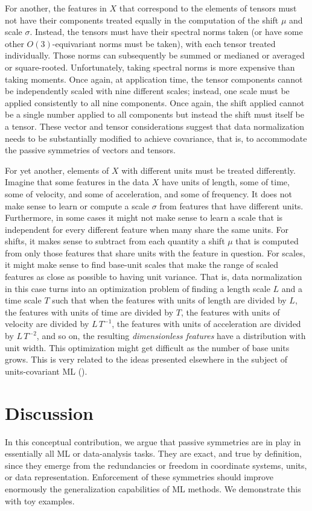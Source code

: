 \documentclass[]{article} %
\begin{document}
For another, the features in $X$ that correspond to the elements of tensors must not have their components treated equally in the computation of the shift $\mu$ and scale $\sigma$.
Instead, the tensors must have their spectral norms taken (or have some other $O(3)$-equivariant norms must be taken), with each tensor treated individually.
Those norms can subsequently be summed or medianed or averaged or square-rooted.
Unfortunately, taking spectral norms is more expensive than taking moments.
Once again, at application time, the tensor components cannot be independently scaled with nine different scales; instead, one scale must be applied consistently to all nine components.
Once again, the shift applied cannot be a single number applied to all components but instead the shift must itself be a tensor.
These vector and tensor considerations suggest that data normalization needs to be substantially modified to achieve covariance, that is, to accommodate the passive symmetries of vectors and tensors.

For yet another, elements of $X$ with different units must be treated differently.
Imagine that some features in the data $X$ have units of length, some of time, some of velocity, and some of acceleration, and some of frequency.
It does not make sense to learn or compute a scale $\sigma$ from features that have different units.
Furthermore, in some cases it might not make sense to learn a scale that is independent for every different feature when many share the same units.
For shifts, it makes sense to subtract from each quantity a shift $\mu$ that is computed from only those features that share units with the feature in question.
For scales, it might make sense to find base-unit scales that make the range of scaled features as close as possible to having unit variance.
That is, data normalization in this case turns into an optimization problem of finding a length scale $L$ and a time scale $T$ such that when the features with units of length are divided by $L$, the features with units of time are divided by $T$, the features with units of velocity are divided by $L\,T^{-1}$, the features with units of acceleration are divided by $L\,T^{-2}$, and so on, the resulting \emph{dimensionless features} have a distribution with unit width.
This optimization might get difficult as the number of base units grows.
This is very related to the ideas presented elsewhere in the subject of units-covariant ML (\citealt{villar2022dimensionless}).

\section{Discussion}\label{sec:discussion}
In this conceptual contribution,
we argue that passive symmetries are in play in essentially all ML or data-analysis tasks.
They are exact, and true by definition, since they emerge from the redundancies or freedom in coordinate systems, units, or data representation.
Enforcement of these symmetries should improve enormously the generalization capabilities of ML methods.
We demonstrate this with toy examples.
\end{document}
